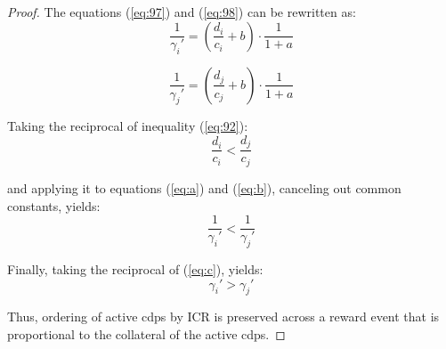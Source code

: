 \documentclass[reqno]{article}
\begin{document}
\begin{proof}
The equations (\ref{eq:97}) and (\ref{eq:98}) can be rewritten as:
\begin{equation} \label{eq:a}
  \frac{1}{\gamma_i'} = \left(\frac{d_i}{c_i}+b\right) \cdot \frac{1}{1 + a}  
\end{equation}

\begin{equation} \label{eq:b}
  \frac{1}{\gamma_j'} = \left(\frac{d_j}{c_j}+b\right) \cdot \frac{1}{1 + a}  
\end{equation}

Taking the reciprocal of inequality (\ref{eq:92}):
\begin{equation}
  \frac{d_i}{c_i} < \frac{d_j}{c_j}
\end{equation}

and applying it to equations (\ref{eq:a}) and (\ref{eq:b}), canceling out common constants, yields:
\begin{equation} \label{eq:c}
  \frac{1}{\gamma_i'} < \frac{1}{\gamma_j'}
\end{equation}

Finally, taking the reciprocal of (\ref{eq:c}), yields:
\begin{equation}
  \gamma_i' > \gamma_j'
\end{equation}

Thus, ordering of active cdps by ICR is preserved across a reward event that is proportional to the collateral of the active cdps.
\end{proof}
\end{document}
